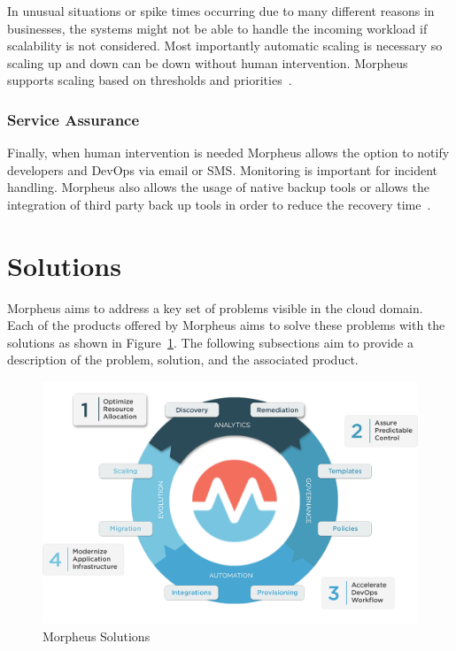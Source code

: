 In unusual situations or spike times occurring due to many different reasons in
businesses, the systems might not be able to handle the incoming workload if
scalability is not considered. Most importantly automatic scaling is necessary
so scaling up and down can be down without human intervention. Morpheus
supports scaling based on thresholds and
priorities~\cite{hid-sp18-416-www-morpheus-architecture}.

\subsubsection{Service Assurance}

Finally, when human intervention is needed Morpheus allows the option to notify
developers and DevOps via email or SMS. Monitoring is important for incident
handling. Morpheus also allows the usage of native backup tools or allows the
integration of third party back up tools in order to reduce the recovery
time~\cite{hid-sp18-416-www-morpheus-architecture}.

\section{Solutions}
\label{sec:solutions}

Morpheus aims to address a key set of problems visible in the cloud domain.
Each of the products offered by Morpheus aims to solve these problems with the
solutions as shown in Figure~\ref{fig:solutions}. The following subsections aim
to provide a description of the problem, solution, and the associated product.

\begin{figure}[htb] 
	\centering
	\includegraphics[width=\columnwidth]{../images/MorpheusSolutions.png}
	\caption{Morpheus Solutions~\cite{hid-sp18-416-www-morpheus-solutions}}
\label{fig:solutions} 
\end{figure}


